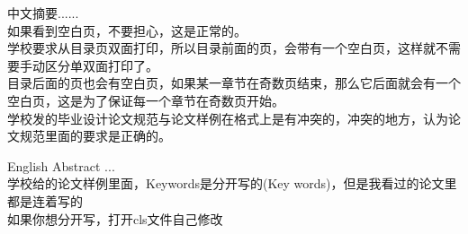 \fancyfoot[C]{\thepage}

\begin{cabstract}%
  中文摘要......\\

  
  如果看到空白页，不要担心，这是正常的。\\
  
  学校要求从目录页双面打印，所以目录前面的页，会带有一个空白页，这样就不需要手动区分单双面打印了。\\
  
  目录后面的页也会有空白页，如果某一章节在奇数页结束，那么它后面就会有一个空白页，这是为了保证每一个章节在奇数页开始。\\
  
  学校发的毕业设计论文规范与论文样例在格式上是有冲突的，冲突的地方，认为论文规范里面的要求是正确的。
\end{cabstract}




\begin{eabstract}%
  English Abstract ...\\

  
  学校给的论文样例里面，Keywords是分开写的(Key words)，但是我看过的论文里都是连着写的\\

  如果你想分开写，打开cls文件自己修改

  
\end{eabstract}

